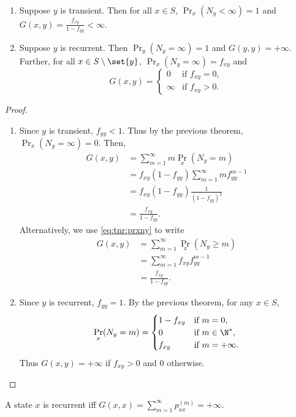 \begin{theorem} \leavevmode
    \begin{enumerate}[label=(\arabic*)]
        \item Suppose $y$ is transient.
        Then for all $x \in S$, $\Pr_x(N_y < \infty) = 1$ and
        $G(x, y) = \frac{f_{xy}}{1 - f_{yy}} < \infty$.
        \item Suppose $y$ is recurrent.
        Then $\Pr_y(N_y = \infty) = 1$ and $G(y, y) = +\infty$.
        Further, for all $x \in S \setminus \set{y}$,
        $\Pr_x(N_y = \infty) = f_{xy}$ and \[
            G(x, y) = \begin{cases}
                0 & \text{if } f_{xy} = 0, \\
                \infty & \text{if } f_{xy} > 0.
            \end{cases}
        \]
    \end{enumerate}
\end{theorem}
\begin{proof} \leavevmode
    \begin{enumerate}[label=(\arabic*)]
        \item Since $y$ is transient, $f_{yy} < 1$.
        Thus by the previous theorem, $\Pr_x(N_y = \infty) = 0$.
        Then, \begin{align*}
            G(x, y) &= \sum_{m=1}^{\infty} m \Pr_x(N_y = m) \\
                    &= f_{xy} (1 - f_{yy})
                        \sum_{m=1}^{\infty} m f_{yy}^{m-1} \\
                    &= f_{xy} (1 - f_{yy}) \frac{1}{(1 - f_{yy})^2} \\
                    &= \frac{f_{xy}}{1 - f_{yy}}.
        \end{align*}
        Alternatively, we use \cref{eq:tnr:prxny} to write \begin{align*}
            G(x, y) &= \sum_{m=1}^{\infty} \Pr_x(N_y \ge m) \\
                    &= \sum_{m=1}^{\infty} f_{xy} f_{yy}^{m-1} \\
                    &= \frac{f_{xy}}{1 - f_{yy}}.
        \end{align*}
        \item Since $y$ is recurrent, $f_{yy} = 1$.
        By the previous theorem, for any $x \in S$, \[
            \Pr_x(N_y = m) = \begin{cases}
                1 - f_{xy} & \text{if } m = 0, \\
                0 & \text{if } m \in \N^*, \\
                f_{xy} & \text{if } m = +\infty.
            \end{cases}
        \] Thus $G(x, y) = +\infty$ if $f_{xy} > 0$ and $0$ otherwise.
        \qedhere
    \end{enumerate}
\end{proof}
\begin{corollary}
    A state $x$ is recurrent iff
    $G(x, x) = \sum_{m=1}^{\infty} p_{xx}^{(m)} = +\infty$.
\end{corollary}

